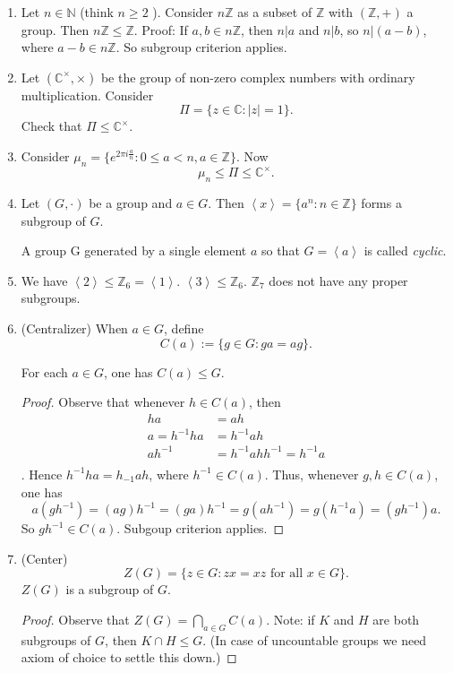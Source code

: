 \begin{example}
	\begin{enumerate}
	\item Let $n \in \mathbb{N}$ (think $n\ge 2$ ). Consider $n\mathbb{Z}$ as a subset of $\mathbb{Z}$ with $(\mathbb{Z},+)$ a group. Then $n\mathbb{Z}\le \mathbb{Z}$. Proof: If $a, b \in n\mathbb{Z}$, then $n|a$ and $n | b$, so $n|(a-b)$, where $a-b \in n\mathbb{Z}$. So subgroup criterion applies.
	\item Let $\left( \mathbb{C}^\times ,\times  \right) $ be the group of non-zero complex numbers with ordinary multiplication. Consider 
		\[
	\Pi = \{z \in \mathbb{C}: |z|=1\}
	.\] 
	Check that $\Pi \le  \mathbb{C}^\times $.
\item Consider $\mu_n = \{e^{2 \pi i \frac{a}{n}}: 0\le a<n, a\in \mathbb{Z}\} 	$. Now
	\[
\mu_n \le \Pi \le  \mathbb{C}^{\times }
.\] 
\item Let $(G, \cdot)$ be a group and $a \in G$. Then $\left\langle x \right\rangle = \{a^n: n \in \mathbb{Z}\} $ forms a subgroup of $G$.
	\begin{definition}
		A group G generated by a single element $a$ so that $G = \left\langle a \right\rangle $ is called \textit{cyclic}.
	\end{definition}
\item We have $\left\langle 2 \right\rangle \le \mathbb{Z}_6 = \left\langle 1 \right\rangle $. $\left\langle 3 \right\rangle \le \mathbb{Z}_6$. $\mathbb{Z}_7$ does not have any proper subgroups.
\item (Centralizer) When $a \in G$, define 
	\[
C(a) := \{g \in G: ga = ag\} 
.\] 
\begin{theorem}
	For each $a \in G$, one has $C(a) \le G$.
\end{theorem}
\begin{proof}
	Observe that whenever $h \in C(a)$, then
	\begin{align*}
		ha&=ah\\
		a = h^{-1}  h a &= h^{-1}  a h \\
		ah^{-1} &= h^{-1} ahh^{-1} =h^{-1} a \\
	\end{align*}
	. Hence $h^{-1} ha = h_{-1} ah$, where $h^{-1}  \in C(a)$. Thus, whenever $g,h \in C(a)$, one has \[
	a(gh^{-1} )=(ag)h^{-1} =(ga)h^{-1} =g(ah^{-1} )=g(h^{-1} a)=(gh^{-1} )a
	.\] 
	So $gh^{-1} \in C(a)$. Subgoup criterion applies.
\end{proof}
\item (Center) 
	\[
Z(G)= \{z\in G: zx=xz \text{ for all }x \in G\}
.\] 
$Z(G)$ is a subgroup of $G$.
\begin{proof}
Observe that $Z(G) = \bigcap_{a \in G} C(a)$. Note: if $K$ and $H$ are both subgroups of $G$, then $K \cap H\le G$. (In case of uncountable groups we need axiom of choice to settle this down.)
\end{proof}


	\end{enumerate}
\end{example}
